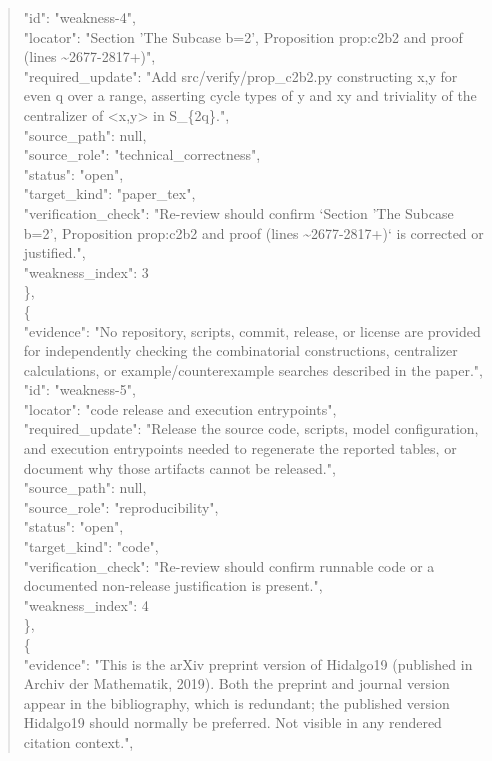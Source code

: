 \documentclass[11pt]{article}
\begin{document}
\begin{quote}
      "id": "weakness-4",\\
      "locator": "Section 'The Subcase b=2', Proposition prop:c2b2 and proof (lines \~{}2677-2817+)",\\
      "required\_update": "Add src/verify/prop\_c2b2.py constructing x,y for even q over a range, asserting cycle types of y and xy and triviality of the centralizer of <x,y> in S\_\{2q\}.",\\
      "source\_path": null,\\
      "source\_role": "technical\_correctness",\\
      "status": "open",\\
      "target\_kind": "paper\_tex",\\
      "verification\_check": "Re-review should confirm `Section 'The Subcase b=2', Proposition prop:c2b2 and proof (lines \~{}2677-2817+)` is corrected or justified.",\\
      "weakness\_index": 3\\
    \},\\
    \{\\
      "evidence": "No repository, scripts, commit, release, or license are provided for independently checking the combinatorial constructions, centralizer calculations, or example/counterexample searches described in the paper.",\\
      "id": "weakness-5",\\
      "locator": "code release and execution entrypoints",\\
      "required\_update": "Release the source code, scripts, model configuration, and execution entrypoints needed to regenerate the reported tables, or document why those artifacts cannot be released.",\\
      "source\_path": null,\\
      "source\_role": "reproducibility",\\
      "status": "open",\\
      "target\_kind": "code",\\
      "verification\_check": "Re-review should confirm runnable code or a documented non-release justification is present.",\\
      "weakness\_index": 4\\
    \},\\
    \{\\
      "evidence": "This is the arXiv preprint version of Hidalgo19 (published in Archiv der Mathematik, 2019). Both the preprint and journal version appear in the bibliography, which is redundant; the published version Hidalgo19 should normally be preferred. Not visible in any rendered citation context.",\\

\end{quote}
\end{document}
